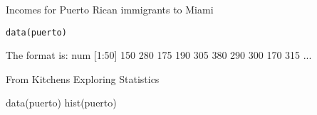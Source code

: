 \begin{Description}\relax
Incomes for Puerto Rican immigrants to Miami
\end{Description}
\begin{Usage}
\begin{verbatim}data(puerto)\end{verbatim}
\end{Usage}
\begin{Format}\relax
The format is:
num [1:50] 150 280 175 190 305 380 290 300 170 315 ...
\end{Format}
\begin{Source}\relax
From Kitchens Exploring Statistics
\end{Source}
\begin{Examples}
\begin{ExampleCode}
data(puerto)
hist(puerto)
\end{ExampleCode}
\end{Examples}

